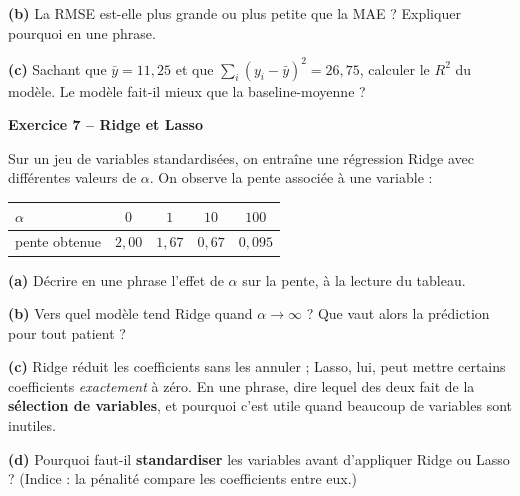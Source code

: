 \documentclass[10pt,a4paper]{article}
\newcommand{\repligne}{\par\vspace{0.42cm}\noindent\dotfill}
\newcommand{\zonecalcul}[1]{\par\vspace{0.15cm}\noindent{\small\emph{Espace de calcul :}}\par\vspace{#1}}
\begin{document}
\textbf{(b)} La RMSE est-elle plus grande ou plus petite que la MAE ? Expliquer pourquoi en une phrase.
\repligne
\repligne

\textbf{(c)} Sachant que $\bar y = 11{,}25$ et que $\sum_i (y_i - \bar y)^2 = 26{,}75$, calculer le $R^2$ du modèle. Le modèle fait-il mieux que la baseline-moyenne ?
\zonecalcul{1.6cm}

\vspace{0.2cm}
\textbf{\large Exercice 7 -- Ridge et Lasso}

\vspace{0.15cm}

Sur un jeu de variables standardisées, on entraîne une régression Ridge avec différentes valeurs de $\alpha$. On observe la pente associée à une variable :

\vspace{0.1cm}
{\small
\renewcommand{\arraystretch}{1.5}
\begin{tabular}{|l|c|c|c|c|}
\hline
$\alpha$ & $0$ & $1$ & $10$ & $100$\\
\hline
pente obtenue & $2{,}00$ & $1{,}67$ & $0{,}67$ & $0{,}095$\\
\hline
\end{tabular}}

\vspace{0.2cm}
\textbf{(a)} Décrire en une phrase l'effet de $\alpha$ sur la pente, à la lecture du tableau.
\repligne
\repligne

\textbf{(b)} Vers quel modèle tend Ridge quand $\alpha \to \infty$ ? Que vaut alors la prédiction pour tout patient ?
\repligne
\repligne

\textbf{(c)} Ridge réduit les coefficients sans les annuler ; Lasso, lui, peut mettre certains coefficients \emph{exactement} à zéro. En une phrase, dire lequel des deux fait de la \textbf{sélection de variables}, et pourquoi c'est utile quand beaucoup de variables sont inutiles.
\repligne
\repligne

\textbf{(d)} Pourquoi faut-il \textbf{standardiser} les variables avant d'appliquer Ridge ou Lasso ? (Indice : la pénalité compare les coefficients entre eux.)
\repligne
\repligne
\end{document}
